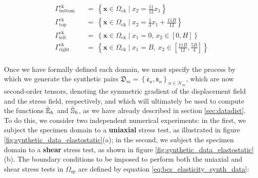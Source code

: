 \begin{equation*}
	\begin{aligned}
		&\Gamma_{\text{bottom}}^{\text{ck}} && = ~ \left\{ \mathbf{x} \in \Omega_{\text{ck}} \mid x_{2} = \frac{11}{12}x_{1} \right\}\\
		&\Gamma_{\text{top}}^{\text{ck}} && = ~\left\{ \mathbf{x} \in \Omega_{\text{ck}} \mid x_{2} = \frac{1}{3}x_{1}+ \frac{11B}{12}\right\}\\
		&\Gamma_{\text{left}}^{\text{ck}} && = ~ \left\{ \mathbf{x} \in \Omega_{\text{ck}} \mid x_1 = 0, \, x_2 \in \left[0,H\right] \right\}\\
		&\Gamma_{\text{right}}^{\text{ck}} &&= ~ \left\{ \mathbf{x}  \in \Omega_{\text{ck}} \mid x_{1} = B, \ x_{2} \in \left[\frac{11B}{12},\frac{5B}{4}\right]\right\} \\
	\end{aligned}
\end{equation*}

Once we have formally defined each domain, we must specify the process by which we generate the synthetic pairs $\mathfrak{D}_{m} = \left\{\mathfrak{e}_{n},\mathfrak{s}_{n}\right\}_{n \in \mathcal{N}_{m}}$, which are now second-order tensors, denoting the symmetric gradient of the displacement field and the stress field, respectively, and which will ultimately be used to compute the functions $\tilde{\mathbb{E}}_h$ and $\tilde{\mathbb{S}}_h$, as we have already described in section \ref{sec:datadist}. To do this, we consider two independent numerical experiments: in the first, we subject the specimen domain to a \textbf{uniaxial} stress test, as illustrated in figure \ref{fig:synthetic_data_elastostatic}(a); in the second, we subject the specimen domain to a \textbf{shear} stress test, as shown in figure \ref{fig:synthetic_data_elastostatic}(b). The boundary conditions to be imposed to perform both the uniaxial and shear stress tests in $ \Omega_{\text{sp}} $ are defined by equation \ref{eq:bcs_elasticity_synth_data}:

